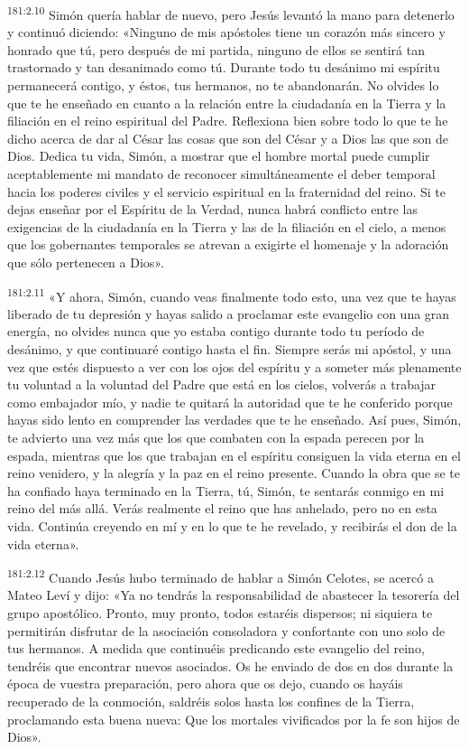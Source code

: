 \par 
\textsuperscript{181:2.10} Simón quería hablar de nuevo, pero Jesús levantó la mano para detenerlo y continuó diciendo: «Ninguno de mis apóstoles tiene un corazón más sincero y honrado que tú, pero después de mi partida, ninguno de ellos se sentirá tan trastornado y tan desanimado como tú. Durante todo tu desánimo mi espíritu permanecerá contigo, y éstos, tus hermanos, no te abandonarán. No olvides lo que te he enseñado en cuanto a la relación entre la ciudadanía en la Tierra y la filiación en el reino espiritual del Padre. Reflexiona bien sobre todo lo que te he dicho acerca de dar al César las cosas que son del César y a Dios las que son de Dios. Dedica tu vida, Simón, a mostrar que el hombre mortal puede cumplir aceptablemente mi mandato de reconocer simultáneamente el deber temporal hacia los poderes civiles y el servicio espiritual en la fraternidad del reino. Si te dejas enseñar por el Espíritu de la Verdad, nunca habrá conflicto entre las exigencias de la ciudadanía en la Tierra y las de la filiación en el cielo, a menos que los gobernantes temporales se atrevan a exigirte el homenaje y la adoración que sólo pertenecen a Dios».

\par 
\textsuperscript{181:2.11} «Y ahora, Simón, cuando veas finalmente todo esto, una vez que te hayas liberado de tu depresión y hayas salido a proclamar este evangelio con una gran energía, no olvides nunca que yo estaba contigo durante todo tu período de desánimo, y que continuaré contigo hasta el fin. Siempre serás mi apóstol, y una vez que estés dispuesto a ver con los ojos del espíritu y a someter más plenamente tu voluntad a la voluntad del Padre que está en los cielos, volverás a trabajar como embajador mío, y nadie te quitará la autoridad que te he conferido porque hayas sido lento en comprender las verdades que te he enseñado. Así pues, Simón, te advierto una vez más que los que combaten con la espada perecen por la espada, mientras que los que trabajan en el espíritu consiguen la vida eterna en el reino venidero, y la alegría y la paz en el reino presente. Cuando la obra que se te ha confiado haya terminado en la Tierra, tú, Simón, te sentarás conmigo en mi reino del más allá. Verás realmente el reino que has anhelado, pero no en esta vida. Continúa creyendo en mí y en lo que te he revelado, y recibirás el don de la vida eterna».

\par 
\textsuperscript{181:2.12} Cuando Jesús hubo terminado de hablar a Simón Celotes, se acercó a Mateo Leví y dijo: «Ya no tendrás la responsabilidad de abastecer la tesorería del grupo apostólico. Pronto, muy pronto, todos estaréis dispersos; ni siquiera te permitirán disfrutar de la asociación consoladora y confortante con uno solo de tus hermanos. A medida que continuéis predicando este evangelio del reino, tendréis que encontrar nuevos asociados. Os he enviado de dos en dos durante la época de vuestra preparación, pero ahora que os dejo, cuando os hayáis recuperado de la conmoción, saldréis solos hasta los confines de la Tierra, proclamando esta buena nueva: Que los mortales vivificados por la fe son hijos de Dios».

